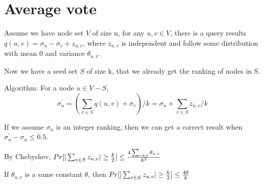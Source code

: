 \documentclass[]{article}
\title{}
\author{}
\begin{document}
\maketitle


\section{Average vote}

Assume we have node set $V$ of size n, for any $u,v\in V$, there is a query results $q(u,v)=\sigma_u-\sigma_v +z_{u,v}$, where $z_{u,v}$ is independent and follow some distribution with mean $0$ and variance $\theta_{u,v}$.  

Now we have a seed set $S$ of size k, that we already get the ranking of nodes in S.

Algorithm: For a node $u\in V-S$, $$\sigma_u^\prime = (\sum_{v\in S}q(u,v)+\sigma_v)/k = \sigma_u+\sum_{v\in S}z_{u,v}/k$$

If we assume $\sigma_u$ is an integer ranking, then we can  get a correct result when $\sigma_u^\prime - \sigma_u\leq 0.5$.

By Chebyshev, $Pr[|\sum_{v\in S}z_{u,v}|\geq {k\over 2}]\leq {4\sum_{v\in S}\theta_{u,v}\over k^2}$ 

If $\theta_{u,v}$ is a same constant $\theta$, then $Pr[|\sum_{v\in S}z_{u,v}|\geq{k\over 2}]\leq {4\theta\over k} $
\end{document}
